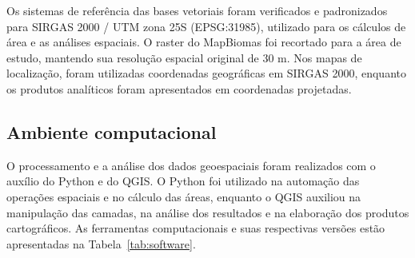 Os sistemas de referência das bases vetoriais foram verificados e padronizados para SIRGAS 2000 / UTM zona 25S (EPSG:31985), utilizado para os cálculos de área e as análises espaciais. O raster do MapBiomas foi recortado para a área de estudo, mantendo sua resolução espacial original de 30 m. Nos mapas de localização, foram utilizadas coordenadas geográficas em SIRGAS 2000, enquanto os produtos analíticos foram apresentados em coordenadas projetadas.

\subsection{Ambiente computacional}

O processamento e a análise dos dados geoespaciais foram realizados com o auxílio do Python e do QGIS. O Python foi utilizado na automação das operações espaciais e no cálculo das áreas, enquanto o QGIS auxiliou na manipulação das camadas, na análise dos resultados e na elaboração dos produtos cartográficos. As ferramentas computacionais e suas respectivas versões estão apresentadas na Tabela~\ref{tab:software}.


